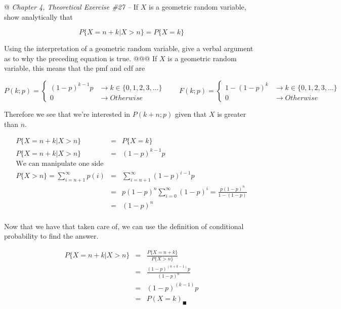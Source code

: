 \documentclass[10pt]{article}
\begin{document}
\begin{easylist}[enumerate]
    @ \textit{Chapter 4, Theoretical Exercise \#27 --} If $X$ is a geometric random variable, show analytically that

    \[ P\{X = n + k|X > n\} = P\{X=k\} \]

    Using the interpretation of a geometric random variable, give a verbal argument as to why the preceding equation is
    true.
    @@@ If $X$ is a geometric random variable, this means that the pmf and cdf are

    \[
        P(k;p) =
        \begin{cases}
            {(1-p)}^{k-1}p &\to k \in \{0, 1, 2, 3, \ldots\}\\
            0 &\to Otherwise
        \end{cases}
        \qquad
        F(k;p) =
        \begin{cases}
            1-{(1-p)}^k &\to k \in \{0, 1, 2, 3, \ldots\}\\
            0 &\to Otherwise
        \end{cases}
    \]

    Therefore we see that we're interested in $P(k+n;p)$ given that $X$ is greater than $n$.

    \[
        \begin{aligned}
            P\{X = n + k|X > n\} &=&  P\{X=k\}\\
            P\{X = n + k|X > n\} &=& {(1-p)}^{k-1}p\\
            \text{We can manipulate one side}\\
            P\{X > n\} = \sum_{i = n+1}^\infty p(i) &=& \sum_{i = n+1}^\infty {(1-p)}^{i - 1}p\\
            &=& p {(1-p)}^n \sum_{i = 0}^\infty {(1-p)}^i = \frac{p {(1-p)}^n}{1-(1-p)}\\
            &=& (1-p)^n\\
        \end{aligned}
    \]

    Now that we have that taken care of, we can use the definition of conditional probability to find the answer.

    \[
        \begin{aligned}
            P\{X = n + k|X > n\} &=&  \frac{P\{X=n+k\}}{P\{X > n\}}\\
            &=& \frac{{(1-p)}^{(n+k-1)}p}{{(1-p)}^n}\\
            &=& {(1-p)}^{(k-1)}p\\
            &=& P(X=k)_\blacksquare\\
        \end{aligned}
    \]


\end{easylist}
\end{document}
